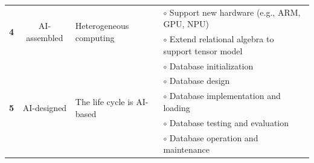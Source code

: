 \begin{table}[h]
{\begin{tabular}{|c|c|l|l|}
\multirow{2}{*}{\textbf{4}} & \multirow{2}{*}{AI-assembled} & \multirow{2}{*}{Heterogeneous computing} &$\circ$ Support new hardware (e.g., ARM, GPU, NPU) \\
 &  &   &$\circ$  Extend relational algebra to support tensor model \\\hline

\multirow{5}{*}{\textbf{5}} & \multirow{5}{*}{AI-designed} & \multirow{5}{*}{The life cycle is AI-based} &$\circ$ Database initialization \\
 &  & & $\circ$  Database design\\
 &  & &$\circ$ Database implementation and loading\\
 &  & &$\circ$  Database testing and evaluation \\
 &  & &$\circ$  Database operation and maintenance \\\hline
  
  \end{tabular}
}
\vspace{-1em}
\end{table}




